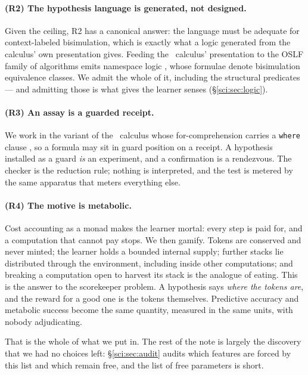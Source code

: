 \paragraph{(R2) The hypothesis language is generated, not designed.} Given the ceiling, R2 has a
canonical answer: the language must be adequate for context-labeled bisimulation, which is exactly
what a logic generated from the calculus' own presentation gives. Feeding the \rhoc\ calculus'
presentation to the OSLF family of algorithms \cite{OSLF} emits namespace logic
\cite{NamespaceLogic}, whose formulae denote bisimulation equivalence classes. We admit the whole of
it, including the structural predicates --- and admitting those is what gives the learner senses
(\S\ref{sci:sec:logic}).

\paragraph{(R3) An assay is a guarded receipt.} We work in the variant of the \rhoc\ calculus whose
for-comprehension carries a \texttt{where} clause \cite[\S9]{Omnibus}, so a formula may sit in guard
position on a receipt. A hypothesis installed as a guard \emph{is} an experiment, and a confirmation
is a rendezvous. The checker is the reduction rule; nothing is interpreted, and the test is metered by
the same apparatus that meters everything else.

\paragraph{(R4) The motive is metabolic.} Cost accounting as a monad \cite{CostMonad} makes the
learner mortal: every step is paid for, and a computation that cannot pay stops. We then gamify.
Tokens are conserved and never minted; the learner holds a bounded internal supply; further stacks lie
distributed through the environment, including inside other computations; and breaking a computation
open to harvest its stack is the analogue of eating. This is the answer to the scorekeeper problem. A
hypothesis says \emph{where the tokens are}, and the reward for a good one is the tokens themselves.
Predictive accuracy and metabolic success become the same quantity, measured in the same units, with
nobody adjudicating.

\medskip
\noindent That is the whole of what we put in. The rest of the note is largely the discovery that we
had no choices left: \S\ref{sci:sec:audit} audits which features are forced by this list and which remain
free, and the list of free parameters is short.

